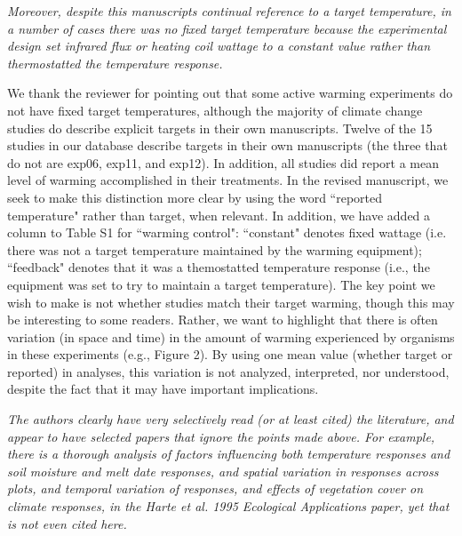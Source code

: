 \documentclass[11pt,a4paper]{letter}
\begin{document}
\begin{letter}{}
\par \emph{Moreover, despite this manuscripts continual reference to a target temperature, in a number of cases there  was no fixed target temperature because the experimental design set infrared flux or heating coil wattage to a constant value rather than thermostatted the temperature response.}
\par We thank the reviewer for pointing out that some active warming experiments do not have fixed target temperatures, although the majority of climate change studies do describe explicit targets in their own manuscripts. Twelve of the 15 studies in our database describe targets in their own manuscripts (the three that do not are exp06, exp11, and exp12). In addition, all studies did report a mean level of warming accomplished in their treatments. In the revised manuscript, we seek to make this distinction  more clear by  using the word ``reported temperature" rather than target, when relevant. In addition, we have added a column to Table S1 for ``warming control": ``constant" denotes fixed wattage (i.e. there was not a target temperature maintained by the warming equipment); ``feedback" denotes that it was a themostatted temperature response (i.e., the equipment was set to try to maintain a target temperature). The key point we wish to make is not whether studies match their target warming, though this may be interesting to some readers. Rather, we want to highlight that there is often variation (in space and time) in the amount of warming experienced by organisms in these experiments (e.g., Figure 2). By using one mean value (whether target or reported) in analyses, this variation is not analyzed, interpreted, nor understood, despite the fact that it may have important implications.

\emph{The authors clearly have very selectively read (or at least cited) the literature,  and appear to have selected papers that ignore the points made above.  For example, there is a  thorough analysis of factors influencing both temperature responses and soil moisture and melt date responses, and spatial variation in responses across plots,  and temporal variation of responses, and effects of vegetation cover on climate responses, in the Harte et al. 1995 Ecological Applications paper, yet that is not even cited here.}


\end{letter}
\end{document}
